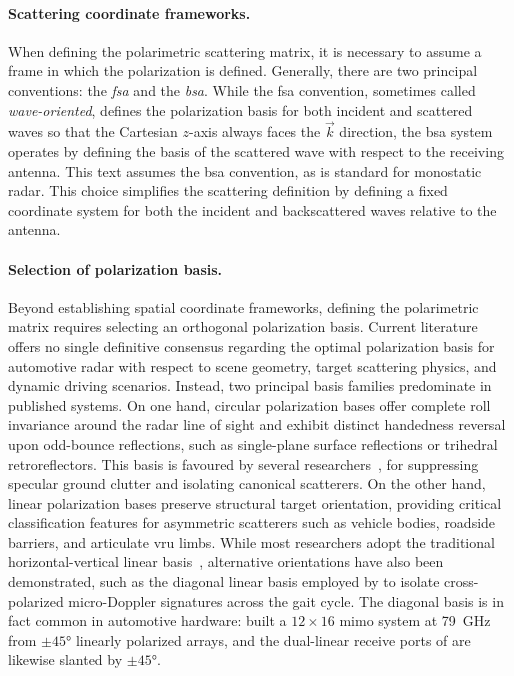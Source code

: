 \paragraph{Scattering coordinate frameworks.}
When defining the polarimetric scattering matrix, it is necessary to assume a frame in which the polarization is defined.
Generally, there are two principal conventions: the \emph{\gls{fsa}} and the \emph{\gls{bsa}}.
While the \gls{fsa} convention, sometimes called \emph{wave-oriented}, defines the polarization basis for both incident and scattered waves so that the Cartesian $z$-axis always faces the $\vec k$ direction, the \gls{bsa} system operates by defining the basis of the scattered wave with respect to the receiving antenna.
This text assumes the \gls{bsa} convention, as is standard for monostatic radar.
This choice simplifies the scattering definition by defining a fixed coordinate system for both the incident and backscattered waves relative to the antenna.

\paragraph{Selection of polarization basis.}
Beyond establishing spatial coordinate frameworks, defining the polarimetric matrix requires selecting an orthogonal polarization basis.
Current literature offers no single definitive consensus regarding the optimal polarization basis for automotive radar with respect to scene geometry, target scattering physics, and dynamic driving scenarios.
Instead, two principal basis families predominate in published systems.
On one hand, circular polarization bases offer complete roll invariance around the radar line of sight and exhibit distinct handedness reversal upon odd-bounce reflections, such as single-plane surface reflections or trihedral retroreflectors.
This basis is favoured by several researchers~\parencite{zang77GHzFully2024,hambergerMixedCircularLinear2019,tillyRoadUserClassification2021,weishauptCalibrationSignalProcessing2022}, for suppressing specular ground clutter and isolating canonical scatterers.
On the other hand, linear polarization bases preserve structural target orientation, providing critical classification features for asymmetric scatterers such as vehicle bodies, roadside barriers, and articulate \gls{vru} limbs.
While most researchers adopt the traditional horizontal-vertical linear basis~\parencite{tintiFullyPolarimetricAutomotive2024,visentinCalibrationFullyPolarimetric2017}, alternative orientations have also been demonstrated, such as the diagonal linear basis employed by \textcite{bouwmeesterClassificationDynamicVulnerable2025} to isolate cross-polarized micro-Doppler signatures across the gait cycle.
The diagonal basis is in fact common in automotive hardware: \textcite{tinti45degLinearlyPolarized2023} built a $12 \times 16$ \gls{mimo} system at \qty{79}{GHz} from $\pm\ang{45}$ linearly polarized arrays, and the dual-linear receive ports of \textcite{hambergerMixedCircularLinear2019} are likewise slanted by $\pm\ang{45}$.

